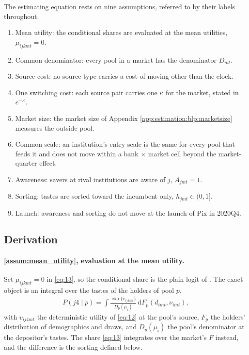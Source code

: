 The estimating equation rests on nine assumptions, referred to by their labels throughout.
\begin{enumerate}[label = A\arabic*, ref = A\arabic*]
	\item\label{assum:mean_utility} Mean utility: the conditional shares are evaluated at the mean utilities, $\mu_{ijkmt}=0$.
	\item\label{assum:common_denominator} Common denominator: every pool in a market has the denominator $D_{mt}$.
	\item\label{assum:source_cost} Source cost: no source type carries a cost of moving other than the clock.
	\item\label{assum:one_kappa} One switching cost: each source pair carries one $\kappa$ for the market, stated in $e^{-\kappa}$.
	\item\label{assum:market_size} Market size: the market size of Appendix \ref{app:estimation:blp:marketsize} measures the outside pool.
	\item\label{assum:scale} Common scale: an institution's entry scale is the same for every pool that feeds it and does not move within a bank $\times$ market cell beyond the market-quarter effect.
	\item\label{assum:awareness} Awareness: savers at rival institutions are aware of $j$, $A_{jmt}=1$.
	\item\label{assum:sorting} Sorting: tastes are sorted toward the incumbent only, $h_{jmt}\in(0,1]$.
	\item\label{assum:launch} Launch: awareness and sorting do not move at the launch of Pix in 2020Q4.
\end{enumerate}

\subsection{Derivation}\label{app:netflow:derivation}

\paragraph{\ref{assum:mean_utility}, evaluation at the mean utility.} Set $\mu_{ijkmt}=0$ in \eqref{eq:13}, so the conditional share is the plain logit of \textcite{berry1994estimating}. The exact object is an integral over the tastes of the holders of pool $p$,
\begin{gather}
	P(j4\mid p)=\int\frac{\exp\bigl\{v_{ij4mt}\bigr\}}{D_{p}(\mu_i)}\,\text{d}F_{p}(d_{imt},\nu_{imt}), \label{eq:app_Pexact}
\end{gather}
with $v_{ij4mt}$ the deterministic utility of \eqref{eq:12} at the pool's source, $F_p$ the holders' distribution of demographics and draws, and $D_p(\mu_i)$ the pool's denominator at the depositor's tastes. The share \eqref{eq:13} integrates over the market's $F$ instead, and the difference is the sorting defined below.

